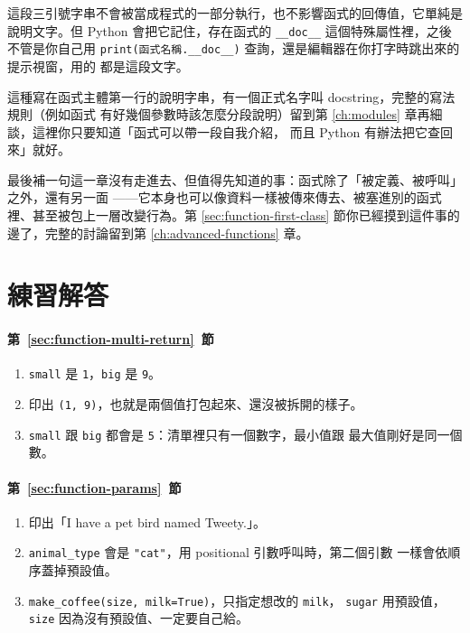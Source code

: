 
這段三引號字串不會被當成程式的一部分執行，也不影響函式的回傳值，它單純是說明文字。但
Python 會把它記住，存在函式的 \texttt{\_\_doc\_\_} 這個特殊屬性裡，之後不管是你自己用
\texttt{print(函式名稱.\_\_doc\_\_)} 查詢，還是編輯器在你打字時跳出來的提示視窗，用的
都是這段文字。

這種寫在函式主體第一行的說明字串，有一個正式名字叫 docstring，完整的寫法規則（例如函式
有好幾個參數時該怎麼分段說明）留到第 \ref{ch:modules} 章再細談，這裡你只要知道「函式可以帶一段自我介紹，
而且 Python 有辦法把它查回來」就好。


最後補一句這一章沒有走進去、但值得先知道的事：函式除了「被定義、被呼叫」之外，還有另一面
——它本身也可以像資料一樣被傳來傳去、被塞進別的函式裡、甚至被包上一層改變行為。第
\ref{sec:function-first-class} 節你已經摸到這件事的邊了，完整的討論留到第
\ref{ch:advanced-functions} 章。

\section*{練習解答}

\paragraph{第~\ref{sec:function-multi-return}~節}
\begin{enumerate}
\item \texttt{small} 是 \texttt{1}，\texttt{big} 是 \texttt{9}。
\item 印出 \texttt{(1, 9)}，也就是兩個值打包起來、還沒被拆開的樣子。
\item \texttt{small} 跟 \texttt{big} 都會是 \texttt{5}：清單裡只有一個數字，最小值跟
最大值剛好是同一個數。
\end{enumerate}

\paragraph{第~\ref{sec:function-params}~節}
\begin{enumerate}
\item 印出「I have a pet bird named Tweety.」。
\item \texttt{animal\_type} 會是 \texttt{"cat"}，用 positional 引數呼叫時，第二個引數
一樣會依順序蓋掉預設值。
\item \texttt{make\_coffee(size, milk=True)}，只指定想改的 \texttt{milk}，
\texttt{sugar} 用預設值，\texttt{size} 因為沒有預設值、一定要自己給。
\end{enumerate}

